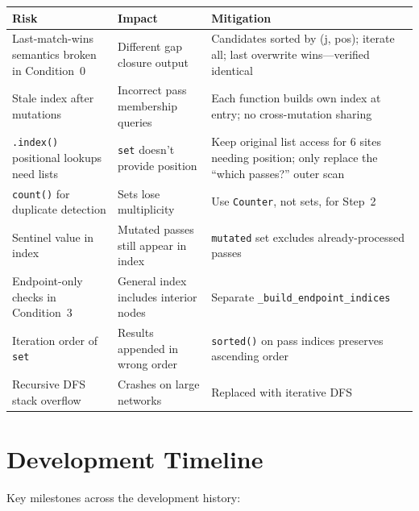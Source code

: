 \documentclass[11pt,a4paper]{article}
\begin{document}
\begin{longtable}{p{4cm}p{4cm}p{6cm}}
\toprule
\textbf{Risk} & \textbf{Impact} & \textbf{Mitigation} \\
\midrule
\endhead
Last-match-wins semantics broken in Condition~0 & Different gap closure output & Candidates sorted by (j, pos); iterate all; last overwrite wins---verified identical \\
\midrule
Stale index after mutations & Incorrect pass membership queries & Each function builds own index at entry; no cross-mutation sharing \\
\midrule
\texttt{.index()} positional lookups need lists & \texttt{set} doesn't provide position & Keep original list access for 6 sites needing position; only replace the ``which passes?'' outer scan \\
\midrule
\texttt{count()} for duplicate detection & Sets lose multiplicity & Use \texttt{Counter}, not sets, for Step~2 \\
\midrule
Sentinel value in index & Mutated passes still appear in index & \texttt{mutated} set excludes already-processed passes \\
\midrule
Endpoint-only checks in Condition~3 & General index includes interior nodes & Separate \texttt{\_build\_endpoint\_indices} \\
\midrule
Iteration order of \texttt{set} & Results appended in wrong order & \texttt{sorted()} on pass indices preserves ascending order \\
\midrule
Recursive DFS stack overflow & Crashes on large networks & Replaced with iterative DFS \\
\bottomrule
\end{longtable}


\section{Development Timeline}

Key milestones across the development history:
\end{document}
